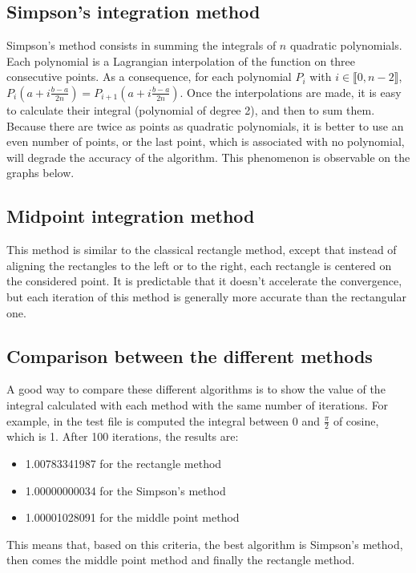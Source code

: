 \documentclass{article}
\begin{document}
\subsection{Simpson's integration method}
Simpson's method consists in summing the integrals of $n$ quadratic polynomials. Each polynomial is a Lagrangian interpolation of the function on three consecutive points.
As a consequence, for each polynomial $P_i$ with $i \in \llbracket 0, n - 2 \rrbracket$, $P_i(a + i \frac{b-a}{2n}) = P_{i+1}(a + i \frac{b-a}{2n})$. Once the interpolations are made, it is easy to calculate their integral (polynomial of degree 2), and then to sum them. Because there are twice as points as quadratic polynomials, it is better to use an even number of points, or the last point, which is associated with no polynomial, will degrade the accuracy of the algorithm. This phenomenon is observable on the graphs below.

\subsection{Midpoint integration method}
This method is similar to the classical rectangle method, except that instead of aligning the rectangles to the left or to the right, each rectangle is centered on the considered point. It is predictable that it doesn't accelerate the convergence, but each iteration of this method is generally more accurate than the rectangular one.

\subsection{Comparison between the different methods}

A good way to compare these different algorithms is to show the value of the integral calculated with each method with the same number of iterations. For example, in the test file is computed the integral between $0$ and $\frac{\pi}{2}$ of cosine, which is 1. After 100 iterations, the results are:
\begin{itemize}
\item 1.00783341987 for the rectangle method
\item 1.00000000034 for the Simpson's method
\item 1.00001028091 for the middle point method
\end{itemize}
This means that, based on this criteria, the best algorithm is Simpson's method, then comes the middle point method and finally the rectangle method.
\end{document}
